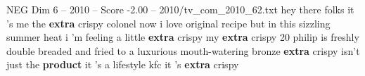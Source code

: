 \begin{textsample}{NEG Dim 6 – 2010 – Score -2.00 – 2010/tv\_com\_2010\_62.txt}  \label{ex:f6_neg_041}
hey there folks it 's me the \textbf{extra} crispy colonel now i love original recipe but in this sizzling summer heat i 'm feeling a little \textbf{extra} crispy my \textbf{extra} crispy 20 philip is freshly double breaded and fried to a luxurious mouth-watering bronze \textbf{extra} crispy isn't just the \textbf{product} it 's a lifestyle kfc it 's \textbf{extra} crispy

\end{textsample}
